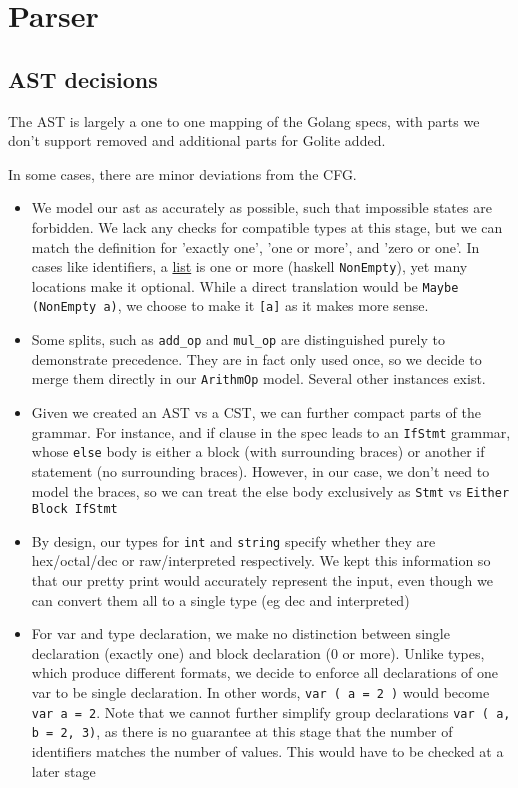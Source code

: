 \documentclass[11pt]{article}
\begin{document}
\section{Parser}
\label{sec:orgba0bb92}
\subsection{AST decisions}
\label{sec:org4787625}
The AST is largely a one to one mapping of the Golang specs, with
parts we don't support removed and additional parts for Golite added.

In some cases, there are minor deviations from the CFG.

\begin{itemize}
\item We model our ast as accurately as possible, such that impossible
states are forbidden. We lack any checks for compatible types at
this stage, but we can match the definition for 'exactly one', 'one
or more', and 'zero or one'. In cases like identifiers, a \href{https://golang.org/ref/spec\#IdentifierList}{list} is
one or more (haskell \texttt{NonEmpty}), yet many locations make it
optional. While a direct translation would be \texttt{Maybe (NonEmpty a)},
we choose to make it \texttt{[a]} as it makes more sense.
\item Some splits, such as \texttt{add\_op} and \texttt{mul\_op} are distinguished purely
to demonstrate precedence. They are in fact only used once, so we
decide to merge them directly in our \texttt{ArithmOp} model. Several other
instances exist.
\item Given we created an AST vs a CST, we can further compact parts of
the grammar. For instance, and if clause in the spec leads to an
\texttt{IfStmt} grammar, whose \texttt{else} body is either a block (with
surrounding braces) or another if statement (no surrounding
braces). However, in our case, we don't need to model the braces, so
we can treat the else body exclusively as \texttt{Stmt} vs \texttt{Either Block
  IfStmt}
\item By design, our types for \texttt{int} and \texttt{string} specify whether they are
hex/octal/dec or raw/interpreted respectively. We kept this
information so that our pretty print would accurately represent the
input, even though we can convert them all to a single type (eg dec
and interpreted)
\item For var and type declaration, we make no distinction between single
declaration (exactly one) and block declaration (0 or more). Unlike
types, which produce different formats, we decide to enforce all
declarations of one var to be single declaration. In other words,
\texttt{var ( a = 2 )} would become \texttt{var a = 2}. Note that we cannot
further simplify group declarations \texttt{var ( a, b = 2, 3)}, as there
is no guarantee at this stage that the number of identifiers matches
the number of values. This would have to be checked at a later stage
\end{itemize}
\end{document}
